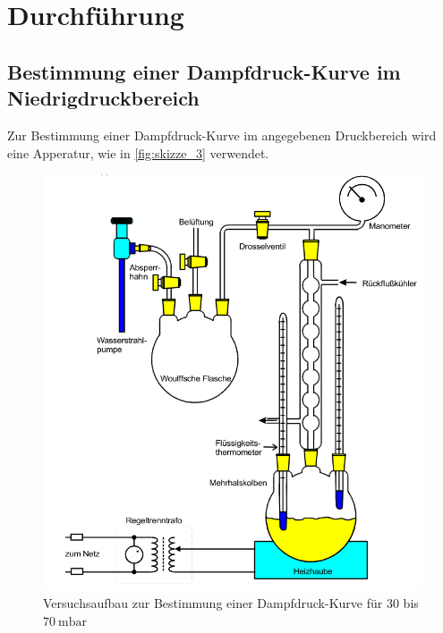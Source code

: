 \section{Durchführung}
\label{sec:Durchführung}


\subsection{Bestimmung einer Dampfdruck-Kurve im Niedrigdruckbereich}
\label{ssec:Da}

Zur Bestimmung einer Dampfdruck-Kurve im angegebenen Druckbereich wird eine Apperatur, wie in \autoref{fig:skizze_3} verwendet.

\begin{figure}
    \centering
    \includegraphics[width=\textwidth]{images/bild3.png}
    \caption{Versuchsaufbau zur Bestimmung einer Dampfdruck-Kurve für $30$ bis $\SI{70}{\milli\bar}$ \cite{V203}}
    \label{fig:skizze_3}
\end{figure}

